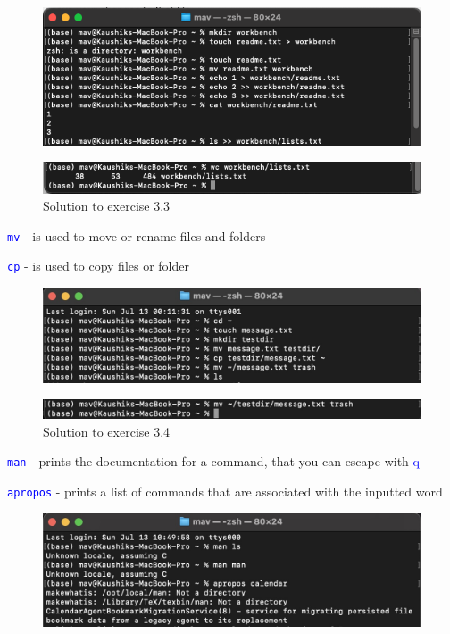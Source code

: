 \documentclass[floatfix, aps]{revtex4-2}
\begin{document}
\begin{figure}[H]
    \centering
    \includegraphics[width=0.75\linewidth]{Exercise 3.3.2 - 1.png}
\end{figure}

\begin{figure}[H]
    \centering
    \includegraphics[width=0.75\linewidth]{Exercise 3.3.2 - 2.png}
    \caption{Solution to exercise 3.3 }
    \label{fig:enter-label}
\end{figure}

\textcolor{blue}{\texttt{mv}} \tab - \tab is used to move or rename files and folders

\textcolor{blue}{\texttt{cp}} \tab - \tab is used to copy files or folder

\begin{figure}[H]
	\centering
	\includegraphics[width=0.75\linewidth]{Exercise 3.4 - 1.jpeg}
\end{figure}

\begin{figure}[H]
	\centering
	\includegraphics[width=0.75\linewidth]{Exercise 3.4 - 2.jpeg}
	\caption{Solution to exercise 3.4}
	\label{fig:enter-label}
\end{figure}

\textcolor{blue}{\texttt{man}} \tab - \tab prints the documentation for a command, that you can escape with \textcolor{blue}{q}

\textcolor{blue}{\texttt{apropos}} \tab - \tab prints a list of commands that are associated with the inputted word

\begin{figure}[H]
	\centering
	\includegraphics[width=0.75\linewidth]{Exercise 4.1 - 1}
\end{figure}
\end{document}
